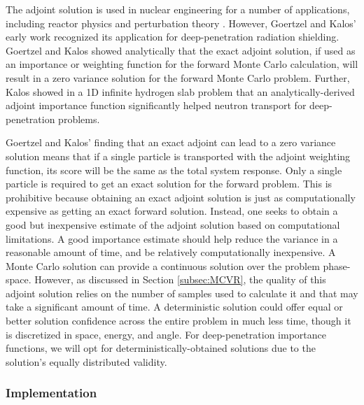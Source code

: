The adjoint solution is used in nuclear engineering for a number of
applications, including reactor physics and perturbation theory
\cite{lewins_importance_1965, lewins_developments_1968,
greenspan_developments_1976, lux_monte_1991}.
However, Goertzel and Kalos' early work recognized its
application for deep-penetration radiation shielding.
Goertzel and Kalos \cite{goertzel_monte_1958}
showed analytically
that the exact adjoint solution, if used as an importance or weighting
function for the forward Monte Carlo calculation, will result in a zero variance
solution for the forward Monte Carlo problem. Further, Kalos
\cite{kalos_importance_1963} showed in a 1D infinite hydrogen slab problem that
an analytically-derived adjoint importance function significantly helped neutron
transport for deep-penetration problems.

Goertzel and Kalos' finding that an exact adjoint can lead to a zero variance
solution means that if a single particle is transported with the adjoint
weighting function, its score will be the same as the total system response.
Only a single particle is required to get an exact solution for the forward
problem. This is prohibitive because obtaining
an exact adjoint solution is just as computationally expensive as getting
an exact forward solution. Instead, one seeks to obtain a good but inexpensive estimate of the
adjoint solution based on computational limitations. A good importance estimate
should help reduce the variance in a reasonable amount of time, and be
relatively computationally inexpensive. A Monte Carlo solution can
provide a continuous solution over the problem phase-space. However, as
discussed in Section \ref{subsec:MCVR}, the quality of this adjoint solution
relies on the number of samples used to calculate it and that may take a
significant amount of time. A deterministic solution could
offer equal or better solution confidence across the entire problem in much less time, though it is
discretized
in space, energy, and angle. For deep-penetration importance functions, we will
opt for deterministically-obtained solutions due to the solution's equally
distributed validity.

\subsubsection{Implementation}

